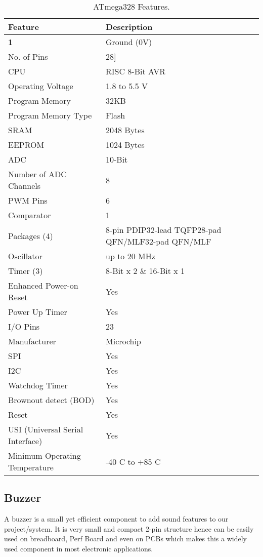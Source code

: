 \begin{table}[h]
	\begin{center}
		
		\begin{tabular}{l|l} 
			\textbf{Feature} & \textbf{Description} \\
			\hline
			\textbf{1} & Ground (0V) \\
			No. of Pins	& 28]\\
			CPU	& RISC 8-Bit AVR\\
			Operating Voltage	& 1.8 to 5.5 V\\
			Program Memory	& 32KB\\
			Program Memory Type	& Flash\\
			SRAM	& 2048 Bytes\\
			EEPROM	& 1024 Bytes\\
			ADC	& 10-Bit\\
			Number of ADC Channels	& 8\\
			PWM Pins	& 6\\
			Comparator	& 1\\
			Packages (4)	& 8-pin PDIP32-lead TQFP28-pad QFN/MLF32-pad QFN/MLF\\
			Oscillator	& up to 20 MHz\\
			Timer (3)	& 8-Bit x 2 \& 16-Bit x 1\\
			Enhanced Power-on Reset	& Yes\\
			Power Up Timer	& Yes\\
			I/O Pins	& 23\\
			Manufacturer	& Microchip\\
			SPI	& Yes\\
			I2C	& Yes\\
			Watchdog Timer	& Yes\\
			Brownout detect (BOD)	& Yes\\
			Reset	& Yes\\
			USI (Universal Serial Interface)	& Yes\\
			Minimum Operating Temperature	& -40 C to +85 C\\
			
		\end{tabular}
		\caption{ATmega328 Features.}
	\end{center}
\end{table}


\pagebreak
\subsection{Buzzer}
A buzzer is a small yet efficient component to add sound features to our project/system. It is very small and compact 2-pin structure hence can be easily used on breadboard, Perf Board and even on PCBs which makes this a widely used component in most electronic applications.\vspace{.3cm}

